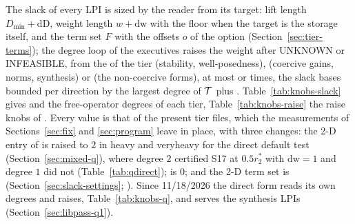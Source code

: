 The slack of every LPI is sized by the reader from its target: lift length $D_{\min}+\mathrm{dD}$, weight length $w+\mathrm{dw}$ with the floor  when the target is the storage itself, and the term set $F$ with the offsets $o$ of the option  (Section~\ref{sec:tier-terms}); the degree loop of the executives raises the weight after UNKNOWN or INFEASIBLE, from the  of the tier (stability, well-posedness),  (coercive gains, norms, synthesis) or  (the non-coercive forms), at most  or  times, the slack bases bounded per direction by the largest degree of $\mathcal{T}$ plus . Table~\ref{tab:knobs-slack} gives  and the free-operator degrees  of each tier, Table~\ref{tab:knobs-raise} the raise knobs of . Every value is that of the present tier files, which the measurements of Sections~\ref{sec:fix} and \ref{sec:program} leave in place, with three changes: the 2-D entry of  is raised to $2$ in heavy and veryheavy for the direct default test (Section~\ref{sec:mixed-q}), where degree $2$ certified S17 at $0.5r_2^*$ with $\mathrm{dw}=1$ and degree $1$ did not (Table~\ref{tab:qdirect});  is $0$; and the 2-D term set is  (Section~\ref{sec:slack-settings}; \gapsref). Since 11/18/2026 the direct form reads its own degrees and raises, Table~\ref{tab:knobs-q}, and  serves the synthesis LPIs (Section~\ref{sec:libpass-q1}).

